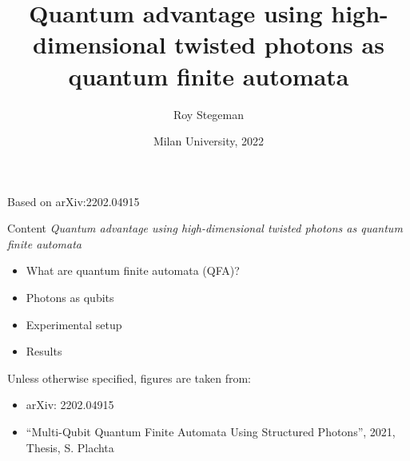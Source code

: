 \documentclass[aspectratio=169,9pt]{beamer}
\title{Quantum advantage using high-dimensional twisted photons as quantum finite automata}
\date{Milan University, 2022}
\author{Roy Stegeman}
\institute{University of Milan and INFN Milan}
\begin{document}
{
\begin{frame}
  \titlepage


  Based on arXiv:2202.04915

\end{frame}
}



\begin{frame}[t]{Content}
  \textit{Quantum advantage using high-dimensional twisted photons as quantum finite automata}
  \vspace*{1em}
  \begin{itemize}
    \item What are quantum finite automata (QFA)?
    \item Photons as qubits
    \item Experimental setup
    \item Results
  \end{itemize}
  \vspace*{5em}
  Unless otherwise specified, figures are taken from:
  \begin{itemize}
    \item arXiv: 2202.04915
    \item ``Multi-Qubit Quantum Finite
    Automata Using Structured
    Photons'', 2021, Thesis, S. Plachta
  \end{itemize}
\end{frame}


\end{document}
